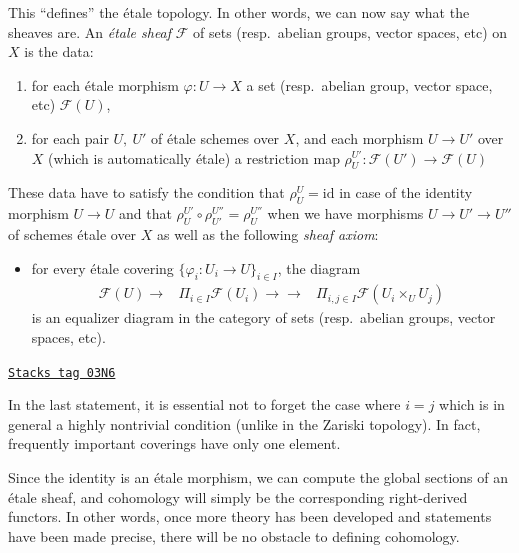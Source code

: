 This ``defines'' the \'etale topology. In other words, we can now say what the
sheaves are. An {\it \'etale sheaf} $\mathcal{F}$ of sets
(resp.\ abelian groups, vector spaces, etc) on $X$ is the data:
\begin{enumerate}
\item for each \'etale morphism $\varphi : U \to X$ a set
(resp.\ abelian group, vector space, etc) $\mathcal{F}(U)$,
\item for each pair $U, \ U'$ of \'etale schemes over $X$,
and each morphism $U \to U'$ over $X$ (which is
automatically \'etale) a restriction map
$\rho^{U'}_U : \mathcal{F}(U') \to \mathcal{F}(U)$
\end{enumerate}
These data have to satisfy the condition that $\rho^U_U = \text{id}$
in case of the identity morphism $U \to U$
and that $\rho^{U'}_U \circ \rho^{U''}_{U'} = \rho^{U''}_U$
when we have morphisms $U \to U' \to U''$ of schemes \'etale over $X$
as well as the following {\it sheaf axiom}:
\begin{itemize}
\item[(*)] for every \'etale covering $\{ \varphi_i : U_i \to U\}_{i \in
I}$, the diagram
$$
\begin{array}{ccc}\mathcal{F} (U) \longrightarrow & \Pi_{i \in I} \mathcal{F} (U_i) \longrightarrow\longrightarrow & \Pi_{i, j \in I} \mathcal{F} (U_i \times_U U_j)\end{array}
$$
is an equalizer diagram in the category of sets
(resp.\ abelian groups, vector spaces, etc).
\end{itemize}

\begin{remark}[I is j]
\label{etale-cohomology-remark-i-is-j}
\href{https://stacks.math.columbia.edu/tag/03N6}{\texttt{Stacks tag 03N6}}

In the last statement, it is essential not to forget the case where $i = j$
which is in general a highly nontrivial condition (unlike in the Zariski
topology). In fact, frequently important coverings have only one element.
\end{remark}

Since the identity is an \'etale morphism, we can compute the global sections
of an \'etale sheaf, and cohomology will simply be the corresponding
right-derived functors. In other words, once more theory has been developed and
statements have been made precise, there will be no obstacle to defining
cohomology.

